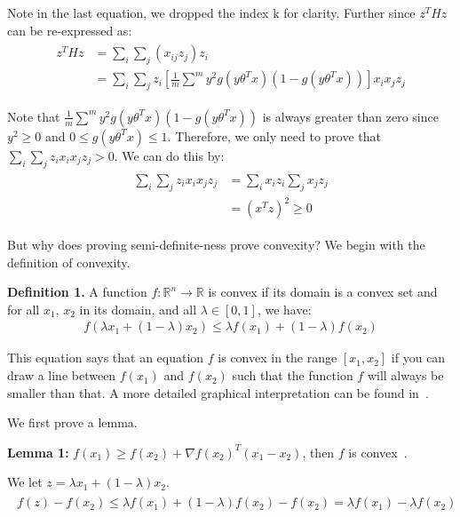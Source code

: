 \documentclass[11pt]{article}
\begin{document}
Note in the last equation, we dropped the index k for clarity. Further since $z^THz$ can 
be re-expressed as:
\begin{align}
		\begin{split}
		z^THz &= \sum_{i}\sum_{j}(x_{ij}z_j)z_i \\
		&= \sum_{i}\sum_{j}z_i[\frac{1}{m}\sum^{m}y^2g(y\theta^Tx)(1-g(y\theta^Tx))]x_ix_jz_j
		\end{split}
\end{align}

Note that $\frac{1}{m}\sum^{m}y^2g(y\theta^Tx)(1-g(y\theta^Tx))$ is always greater than 
zero since $y^2 \geq 0$ and $0 \leq g(y\theta^Tx) \leq 1$. Therefore, we only need to 
prove that $\sum_{i}\sum_{j}z_ix_ix_jz_j>0$. We can do this by:
\begin{align}
		\begin{split}
		\sum_{i}\sum_{j}z_ix_ix_jz_j &= \sum_{i}x_iz_i\sum_{j}x_jz_j \\
		&= (x^Tz)^2 \geq 0 
		\end{split}
\end{align}

But why does proving semi-definite-ness prove convexity? We begin with the definition of 
convexity.

\textbf{Definition 1.} A function $f: \mathbb{R}^n \rightarrow \mathbb{R}$ is convex if 
its domain is a convex set and for all $x_1$, $x_2$ in its domain, and all 
$\lambda \in [0,1]$, we have:
\begin{align}
	f(\lambda x_1+(1-\lambda)x_2) \leq \lambda f(x_1) + (1-\lambda)f(x_2)
\end{align}

This equation says that an equation $f$ is convex in the range $[x_1, x_2]$ if you can 
draw a line between $f(x_1)$ and $f(x_2)$ such that the function $f$ will always be 
smaller than that. A more detailed graphical interpretation can be found 
in~\cite{convexity}.

We first prove a lemma.

\textbf{Lemma 1:} $f(x_1) \geq f(x_2) + \nabla f(x_2)^T(x_1-x_2)$, then $f$ is 
convex~\cite{characterConvexity}. 

We let $z=\lambda x_1 + (1-\lambda)x_2$. 
\begin{align}
	\begin{split}
		f(z)-f(x_2) \leq \lambda f(x_1) + (1-\lambda)f(x_2) - f(x_2) = \lambda f(x_1) - \lambda f(x_2)
	\end{split}
\end{align}
\end{document}
